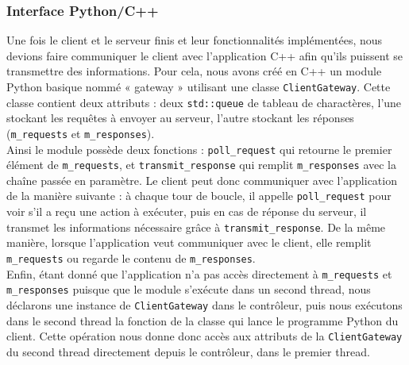 \documentclass[twoside]{report}
\begin{document}
\subsubsection{Interface Python/C++}
Une fois le client et le serveur finis et leur fonctionnalités implémentées, nous devions faire communiquer le client avec l'application C++ afin qu'ils puissent se transmettre des informations. Pour cela, nous avons créé en C++ un module Python basique nommé « gateway » utilisant une classe \verb!ClientGateway!. Cette classe contient deux attributs : deux \verb!std::queue! de tableau de charactères, l'une stockant les requêtes à envoyer au serveur, l'autre stockant les réponses (\verb!m_requests! et \verb!m_responses!).\\
Ainsi le module possède deux fonctions : \verb!poll_request! qui retourne le premier élément de \verb!m_requests!, et \verb!transmit_response! qui remplit \verb!m_responses! avec la chaîne passée en paramètre. Le client peut donc communiquer avec l'application de la manière suivante : à chaque tour de boucle, il appelle \verb!poll_request! pour voir s'il a reçu une action à exécuter, puis en cas de réponse du serveur, il transmet les informations nécessaire grâce à \verb!transmit_response!. De la même manière, lorsque l'application veut communiquer avec le client, elle remplit \verb!m_requests! ou regarde le contenu de \verb!m_responses!.\\
Enfin, étant donné que l'application n'a pas accès directement à \verb!m_requests! et \verb!m_responses! puisque que le module s'exécute dans un second thread, nous déclarons une instance de \verb!ClientGateway! dans le contrôleur, puis nous exécutons dans le second thread la fonction de la classe qui lance le programme Python du client. Cette opération nous donne donc accès aux attributs de la \verb!ClientGateway! du second thread directement depuis le contrôleur, dans le premier thread.
\end{document}
